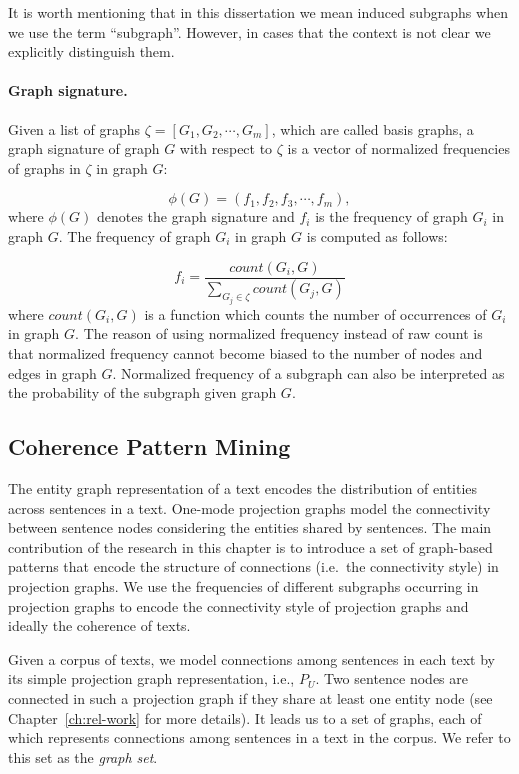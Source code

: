 It is worth mentioning that in this dissertation we mean induced subgraphs when we use the term ``subgraph''.  
However, in cases that the context is not clear we explicitly distinguish them. 

\paragraph{Graph signature.}
%
Given a list of graphs $ \zeta  = \left[ G_1, G_2, \cdots , G_m \right]$, which are called basis graphs, a graph signature of graph $G$ with respect to $\zeta$ is a vector of normalized frequencies of graphs in $\zeta$ in graph $G$:

\begin{equation}
	\phi \left( G \right) = \left( f_1, f_2, f_3, \cdots, f_m \right),
\end{equation}
where  $\phi \left( G \right)$ denotes the graph signature and $f_i$ is the frequency of graph $G_i$ in graph $G$. 
The frequency of graph $G_i$ in graph $G$ is computed as follows:

\begin{equation}
 f_i = \frac{count(G_i, G)}{\sum_{G_j \in \zeta}{count(G_j, G)}}
\end{equation}
where $count(G_i, G)$ is a function which counts the number of occurrences of $G_i$ in graph $G$. 
The reason of using normalized frequency instead of raw count is that normalized frequency cannot become biased to the number of nodes and edges in graph $G$. 
Normalized frequency of a subgraph can also be interpreted as the probability of the subgraph given graph $G$.  

\subsection{Coherence Pattern Mining}

The entity graph representation of a text encodes the distribution of entities across sentences in a text. 
One-mode projection graphs model the connectivity between sentence nodes considering the entities shared by sentences. 
The main contribution of the research in this chapter is to introduce a set of graph-based patterns that encode the structure of connections (i.e.\ the connectivity style) in projection graphs.  
We use the frequencies of different subgraphs occurring in projection graphs to encode the connectivity style of projection graphs and ideally the coherence of texts. 

Given a corpus of texts, we model connections among sentences in each text by its simple projection graph representation, i.e., $P_U$. 
Two sentence nodes are connected in such a projection graph if they share at least one entity node (see Chapter~\ref{ch:rel-work} for more details).  
It leads us to a set of graphs, each of which represents connections among sentences in a text in the corpus.   
We refer to this set as the \emph{graph set}. 

